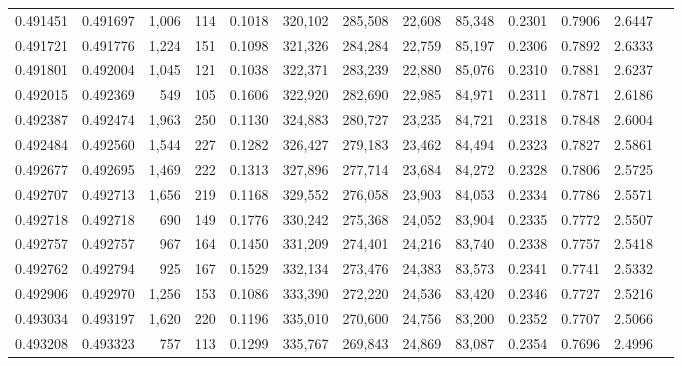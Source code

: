 \begin{tabular}{rrrrrrrrrrrrr}
0.491451 & 0.491697 & 1,006 &   114 &                                     0.1018 & 320,102 & 285,508 &  22,608 &  85,348 & 0.2301 & 0.7906 & 2.6447 \\
0.491721 & 0.491776 & 1,224 &   151 &                                     0.1098 & 321,326 & 284,284 &  22,759 &  85,197 & 0.2306 & 0.7892 & 2.6333 \\
0.491801 & 0.492004 & 1,045 &   121 &                                     0.1038 & 322,371 & 283,239 &  22,880 &  85,076 & 0.2310 & 0.7881 & 2.6237 \\
0.492015 & 0.492369 &   549 &   105 &                                     0.1606 & 322,920 & 282,690 &  22,985 &  84,971 & 0.2311 & 0.7871 & 2.6186 \\
0.492387 & 0.492474 & 1,963 &   250 &                                     0.1130 & 324,883 & 280,727 &  23,235 &  84,721 & 0.2318 & 0.7848 & 2.6004 \\
0.492484 & 0.492560 & 1,544 &   227 &                                     0.1282 & 326,427 & 279,183 &  23,462 &  84,494 & 0.2323 & 0.7827 & 2.5861 \\
0.492677 & 0.492695 & 1,469 &   222 &                                     0.1313 & 327,896 & 277,714 &  23,684 &  84,272 & 0.2328 & 0.7806 & 2.5725 \\
0.492707 & 0.492713 & 1,656 &   219 &                                     0.1168 & 329,552 & 276,058 &  23,903 &  84,053 & 0.2334 & 0.7786 & 2.5571 \\
0.492718 & 0.492718 &   690 &   149 &                                     0.1776 & 330,242 & 275,368 &  24,052 &  83,904 & 0.2335 & 0.7772 & 2.5507 \\
0.492757 & 0.492757 &   967 &   164 &                                     0.1450 & 331,209 & 274,401 &  24,216 &  83,740 & 0.2338 & 0.7757 & 2.5418 \\
0.492762 & 0.492794 &   925 &   167 &                                     0.1529 & 332,134 & 273,476 &  24,383 &  83,573 & 0.2341 & 0.7741 & 2.5332 \\
0.492906 & 0.492970 & 1,256 &   153 &                                     0.1086 & 333,390 & 272,220 &  24,536 &  83,420 & 0.2346 & 0.7727 & 2.5216 \\
0.493034 & 0.493197 & 1,620 &   220 &                                     0.1196 & 335,010 & 270,600 &  24,756 &  83,200 & 0.2352 & 0.7707 & 2.5066 \\
0.493208 & 0.493323 &   757 &   113 &                                     0.1299 & 335,767 & 269,843 &  24,869 &  83,087 & 0.2354 & 0.7696 & 2.4996 \\

\end{tabular}
